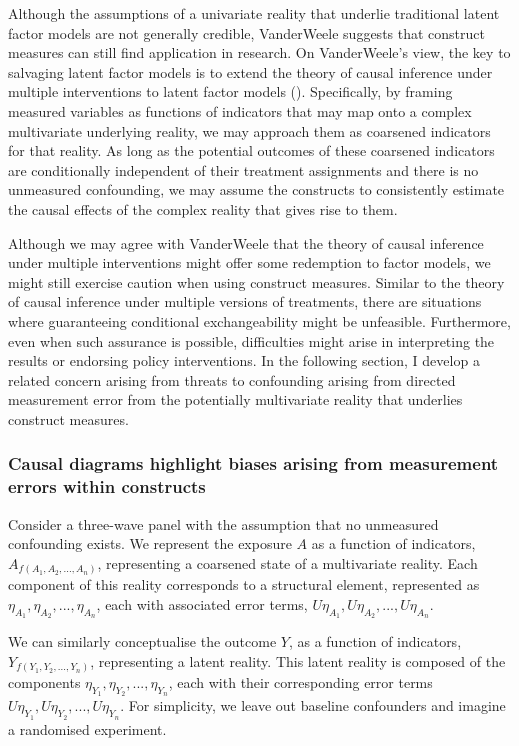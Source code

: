 \documentclass[
  singlecolumn,
  9pt]{article}
\begin{document}
Although the assumptions of a univariate reality that underlie
traditional latent factor models are not generally credible, VanderWeele
suggests that construct measures can still find application in research.
On VanderWeele's view, the key to salvaging latent factor models is to
extend the theory of causal inference under multiple interventions to
latent factor models ().
Specifically, by framing measured variables as functions of indicators
that may map onto a complex multivariate underlying reality, we may
approach them as coarsened indicators for that reality. As long as the
potential outcomes of these coarsened indicators are conditionally
independent of their treatment assignments and there is no unmeasured
confounding, we may assume the constructs to consistently estimate the
causal effects of the complex reality that gives rise to them.

Although we may agree with VanderWeele that the theory of causal
inference under multiple interventions might offer some redemption to
factor models, we might still exercise caution when using construct
measures. Similar to the theory of causal inference under multiple
versions of treatments, there are situations where guaranteeing
conditional exchangeability might be unfeasible. Furthermore, even when
such assurance is possible, difficulties might arise in interpreting the
results or endorsing policy interventions. In the following section, I
develop a related concern arising from threats to confounding arising
from directed measurement error from the potentially multivariate
reality that underlies construct measures.

\subsubsection{Causal diagrams highlight biases arising from measurement
errors within
constructs}\label{causal-diagrams-highlight-biases-arising-from-measurement-errors-within-constructs}

Consider a three-wave panel with the assumption that no unmeasured
confounding exists. We represent the exposure \(A\) as a function of
indicators, \(A_{f(A_1, A_2, ..., A_n)}\), representing a coarsened
state of a multivariate reality. Each component of this reality
corresponds to a structural element, represented as
\(\eta_{A_1}, \eta_{A_2}, ..., \eta_{A_n}\), each with associated error
terms, \(U\eta_{A_1}, U\eta_{A_2}, ..., U\eta_{A_n}\).

We can similarly conceptualise the outcome \(Y\), as a function of
indicators, \(Y_{f(Y_1, Y_2, ..., Y_n)}\), representing a latent
reality. This latent reality is composed of the components
\(\eta_{Y_1}, \eta_{Y_2}, ..., \eta_{Y_n}\), each with their
corresponding error terms
\(U\eta_{Y_1}, U\eta_{Y_2}, ..., U\eta_{Y_n}\). For simplicity, we leave
out baseline confounders and imagine a randomised experiment.
\end{document}
